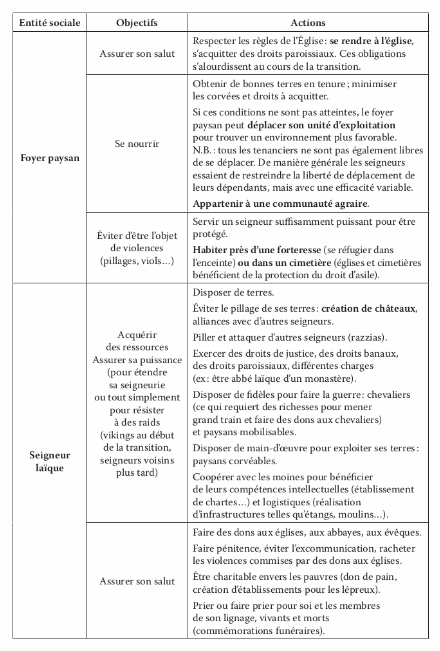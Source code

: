 \begin{figure}[H]
	\centering
	\includegraphics[width=1\linewidth]{src/Chapitre_TMD/Tab1_1.png}
\end{figure}

